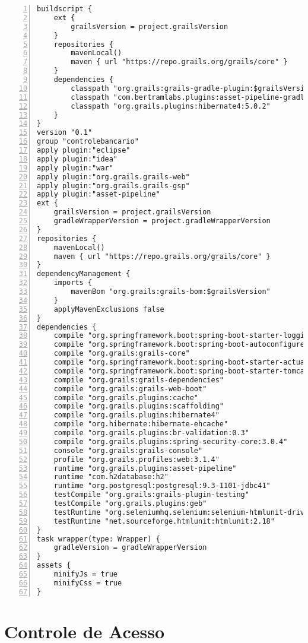 \begin{lstlisting}[numbers=left, caption={\bf BuildConfig.groovy}, frame = trBL,
    float=htbp, label=codBuildGradle2]
buildscript {
    ext {
        grailsVersion = project.grailsVersion
    }
    repositories {
        mavenLocal()
        maven { url "https://repo.grails.org/grails/core" }
    }
    dependencies {
        classpath "org.grails:grails-gradle-plugin:$grailsVersion"
        classpath "com.bertramlabs.plugins:asset-pipeline-gradle:2.5.0"
        classpath "org.grails.plugins:hibernate4:5.0.2"
    }
}
version "0.1"
group "controlebancario"
apply plugin:"eclipse"
apply plugin:"idea"
apply plugin:"war"
apply plugin:"org.grails.grails-web"
apply plugin:"org.grails.grails-gsp"
apply plugin:"asset-pipeline"
ext {
    grailsVersion = project.grailsVersion
    gradleWrapperVersion = project.gradleWrapperVersion
}
repositories {
    mavenLocal()
    maven { url "https://repo.grails.org/grails/core" }
}
dependencyManagement {
    imports {
        mavenBom "org.grails:grails-bom:$grailsVersion"
    }
    applyMavenExclusions false
}
dependencies {
    compile "org.springframework.boot:spring-boot-starter-logging"
    compile "org.springframework.boot:spring-boot-autoconfigure"
    compile "org.grails:grails-core"
    compile "org.springframework.boot:spring-boot-starter-actuator"
    compile "org.springframework.boot:spring-boot-starter-tomcat"
    compile "org.grails:grails-dependencies"
    compile "org.grails:grails-web-boot"
    compile "org.grails.plugins:cache"
    compile "org.grails.plugins:scaffolding"
    compile "org.grails.plugins:hibernate4"
    compile "org.hibernate:hibernate-ehcache"
    compile "org.grails.plugins:br-validation:0.3"
    compile "org.grails.plugins:spring-security-core:3.0.4"
    console "org.grails:grails-console"
    profile "org.grails.profiles:web:3.1.4"
    runtime "org.grails.plugins:asset-pipeline"
    runtime "com.h2database:h2"
    runtime "org.postgresql:postgresql:9.3-1101-jdbc41"
    testCompile "org.grails:grails-plugin-testing"
    testCompile "org.grails.plugins:geb"
    testRuntime "org.seleniumhq.selenium:selenium-htmlunit-driver:2.47.1"
    testRuntime "net.sourceforge.htmlunit:htmlunit:2.18"
}
task wrapper(type: Wrapper) {
    gradleVersion = gradleWrapperVersion
}
assets {
    minifyJs = true
    minifyCss = true
}
\end{lstlisting}

\newpage

\section{Controle de Acesso}

